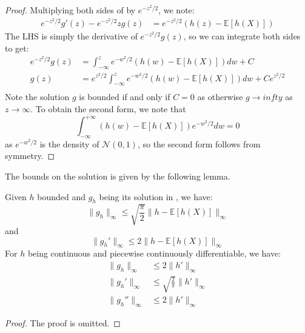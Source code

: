 \documentclass{article}
\begin{document}
    \begin{proof}
        Multiplying both sides of  by $e^{-z^2/2}$, we note:
        \begin{align*}
            e^{-z^2/2} g'(z) - e^{-z^2/2}zg(z) &= e^{-z^2/2} (h(z) - \mathbb{E}[h(X)]) 
        \end{align*}
        The LHS is simply the derivative of $e^{-z^2/2}g(z)$, so we can integrate both sides to get:
        \begin{align*}
            e^{-z^2/2}g(z) &= \int_{-\infty}^z e^{-w^2/2} (h(w) - \mathbb{E}[h(X)]) dw +C\\
            g(z) &= e^{z^2/2} \int_{-\infty}^z e^{-w^2/2} (h(w) - \mathbb{E}[h(X)]) dw + Ce^{z^2/2}\\
        \end{align*}
        Note the solution $g$ is bounded if and only if $C=0$ as otherwise $g\to infty$ as $z\to \infty$.  
        To obtain the second form, we note that 
        \begin{equation*}
            \int_{-\infty}^{+\infty} (h(w) - \mathbb{E}[h(X)]) e^{-w^2/2} dw = 0
        \end{equation*}
        as $e^{-w^2/2}$ is the density of $\mathcal{N}(0,1)$, so the second form follows from symmetry.
    \end{proof}

The bounds on the solution is given by the following lemma.  
\begin{lemma}\label{lem:stein_equation_normal_bound}
    Given $h$ bounded and $g_h$ being its solution in , we have:
    \begin{equation*}
        \|g_h\|_\infty \leq \sqrt{\frac{\pi}{2}} \|h - \mathbb{E}[h(X)]\|_\infty
    \end{equation*}
    and 
    \begin{equation*}
        \|g_h'\|_\infty \leq 2 \|h-\mathbb{E}[h(X)]\|_\infty
    \end{equation*}
    For $h$ being continuous and piecewise continuously differentiable, we have:
    \begin{align*}
        \|g_h\|_\infty &\leq 2 \|h'\|_\infty \\
        \|g_h'\|_\infty &\leq \sqrt{\frac{2}{\pi}} \|h'\|_\infty\\
        \|g_h''\|_\infty &\leq 2 \|h'\|_\infty
    \end{align*}
\end{lemma}
\begin{proof}
    The proof is omitted.
\end{proof}
\end{document}
